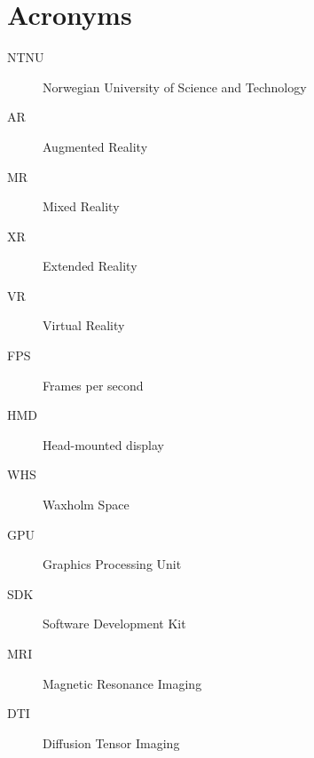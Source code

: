 
\chapter{Acronyms}
\begin{description}
\item[NTNU] Norwegian University of Science and Technology
\item[AR] Augmented Reality
\item[MR] Mixed Reality
\item[XR] Extended Reality
\item[VR] Virtual Reality
\item[FPS] Frames per second
\item[HMD] Head-mounted display
\item[WHS] Waxholm Space
\item[GPU] Graphics Processing Unit
\item[SDK] Software Development Kit
\item[MRI] Magnetic Resonance Imaging 
\item[DTI] Diffusion Tensor Imaging 
\end{description}